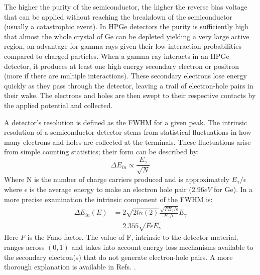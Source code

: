 The higher the purity of the semiconductor, the higher the reverse bias voltage that can be applied without reaching the breakdown of the semiconductor (usually a catastrophic event). In HPGe detectors the purity is sufficiently high that almost the whole crystal of Ge can be depleted yielding a very large active region, an advantage for gamma rays given their low interaction probabilities compared to charged particles. When a gamma ray interacts in an HPGe detector, it produces at least one high energy secondary electron or positron (more if there are multiple interactions). These secondary electrons lose energy quickly as they pass through the detector, leaving a trail of electron-hole pairs in their wake. The electrons and holes are then swept to their respective contacts by the applied potential and collected.

A detector's resolution is defined as the FWHM for a given peak. The intrinsic resolution of a semiconductor detector stems from statistical fluctuations in how many electrons and holes are collected at the terminals. These fluctuations arise from simple counting statistics; their form can be described by:
\begin{equation}
\label{eqn:chp3-hpge-res-est} 
\Delta{}E_{in} \propto \frac{E_{\gamma}}{\sqrt{N}}
\end{equation}
Where N is the number of charge carriers produced and is approximately $E_{\gamma}/\epsilon$ where $\epsilon$ is the average energy to make an electron hole pair ($2.96eV$ for Ge). In a more precise examination the intrinsic component of the FWHM is:
\begin{equation}
\label{eqn:chp3-hpge-in-res} 
\begin{split}
\Delta{}E_{in}(E) & = 2\sqrt{2 ln(2)}\frac{\sqrt{F E_{\gamma{}}/\epsilon{}}}{E_{\gamma{}}/\epsilon{}}E_{\gamma{}}\\
       & = 2.355\sqrt{F\epsilon{}E_{\gamma{}}}
\end{split}
\end{equation}
Here $F$ is the Fano factor. The value of F, intrinsic to the detector material, ranges across $(0,1)$ and takes into account energy loss mechanisms available to the secondary electron(s) that do not generate electron-hole pairs. A more thorough explanation is available in Refs. \cite{fano_factor1,knollBook}.

